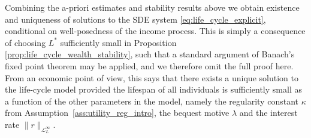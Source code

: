 \documentclass[11pt,oneside,english,reqno,dvipsnames,table]{amsart}
\numberwithin{equation}{section}
\theoremstyle{plain}
\theoremstyle{definition}
\theoremstyle{remark}
\theoremstyle{plain}
\theoremstyle{plain}
\theoremstyle{plain}
\theoremstyle{plain}
\theoremstyle{plain}
\theoremstyle{plain}
\theoremstyle{plain}
\newcommand{\msL}{\mathscr{L}}
\numberwithin{thm}{section}
\begin{document}
Combining the a-priori estimates and stability results above we obtain existence and uniqueness of solutions to the SDE system \eqref{eq:life_cycle_explicit}, conditional on well-posedness of the income process. This is simply a consequence of choosing $L^*$ sufficiently small in Proposition \ref{prop:life_cycle_wealth_stability}, such that a standard argument of Banach's fixed point theorem may be applied, and we therefore omit the full proof here. From an economic point of view, this says that there exists a unique solution to the life-cycle model provided the lifespan of all individuals is sufficiently small as a function of the other parameters in the model, namely the regularity constant $\kappa$ from Assumption~\ref{ass:utility_reg_intro}, the bequest motive $\lambda$ and the interest rate $\|r\|_{\msL^\infty_L}$.
%
\end{document}
